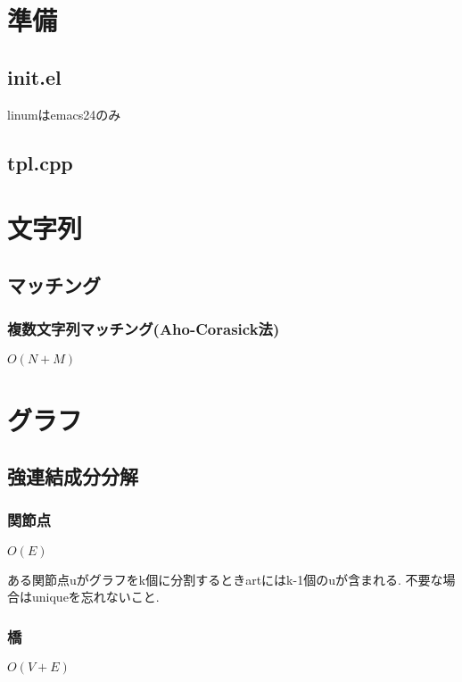 \documentclass[9pt,twocolumn,a4paper,landscape]{extarticle}
\begin{document}
\tableofcontents
\newpage
%
%
\section{準備}
\subsection{init.el}
linumはemacs24のみ\par


\subsection{tpl.cpp}


\section{文字列}
\subsection{マッチング}
\subsubsection{複数文字列マッチング(Aho-Corasick法)}
$O(N+M)$\par


\section{グラフ}
\subsection{強連結成分分解}
\subsubsection{関節点}
$O(E)$\par
ある関節点uがグラフをk個に分割するときartにはk-1個のuが含まれる. 不要な場合はuniqueを忘れないこと.\par


\subsubsection{橋}
$O(V+E)$\par

\end{document}
